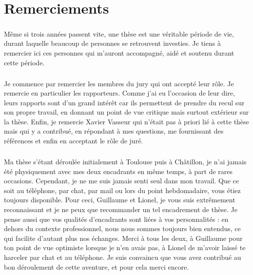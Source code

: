 \chapter{Remerciements}

  \paragraph{}
  Même si trois années passent vite, une thèse est une véritable période de vie, durant laquelle beaucoup de personnes se retrouvent investies.
  Je tiens à remercier ici ces personnes qui m'auront accompagné, aidé et soutenu durant cette période.

  \paragraph{}
  Je commence par remercier les membres du jury qui ont accepté leur rôle.
  Je remercie en particulier les rapporteurs.
  Comme j'ai eu l'occasion de leur dire, leurs rapports sont d'un grand intérêt car ils permettent de prendre du recul sur son propre travail, en donnant un point de vue critique mais surtout extérieur sur la thèse.
  Enfin, je remercie Xavier Vasseur qui n'était pas à priori lié à cette thèse mais qui y a contribué, en répondant à mes questions, me fournissant des références et enfin en acceptant le rôle de juré.

  \paragraph{}
  Ma thèse s'étant déroulée initialement à Toulouse puis à Châtillon, je n'ai jamais été physiquement avec mes deux encadrants en même temps, à part de rares occasions.
  Cependant, je ne me suis jamais senti seul dans mon travail.
  Que ce soit au téléphone, par chat, par mail ou lors du point hebdomadaire, vous étiez toujours disponible.
  Pour ceci, Guillaume et Lionel, je vous suis extrêmement reconnaissant et je ne peux que recommander un tel encadrement de thèse.
  Je pense aussi que vos qualités d'encadrants sont liées à vos personnalités : en dehors du contexte professionnel, nous nous sommes toujours bien entendus, ce qui facilite d'autant plus nos échanges.
  Merci à tous les deux, à Guillaume pour ton point de vue optimiste lorsque je n'en avais pas, à Lionel de m'avoir laissé te harceler par chat et au téléphone.
  Je suis convaincu que vous avez contribué au bon déroulement de cette aventure, et pour cela merci encore.

